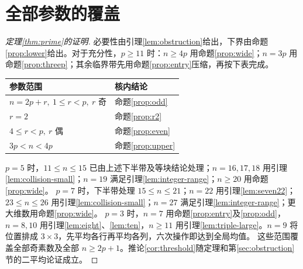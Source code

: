 \section{全部参数的覆盖}\label{sec:completion}
\begin{proof}[定理\ref{thm:prime}的证明]
必要性由引理\ref{lem:obstruction}给出，下界由命题\ref{prop:lower}给出。对于充分性，$p\ge11$ 时：$n\ge4p$ 用命题\ref{prop:wide}；$n=3p$ 用命题\ref{prop:threep}；其余临界带先用命题\ref{prop:entry}压缩，再按下表完成。
\begin{center}
\begin{tabular}{ll}
\toprule 参数范围 & 核内结论\\\midrule
$n=2p+r,\ 1\le r<p,\ r$ 奇 & 命题\ref{prop:odd}\\
$r=2$ & 命题\ref{prop:r2}\\
$4\le r<p,\ r$ 偶 & 命题\ref{prop:even}\\
$3p<n<4p$ & 命题\ref{prop:upper}\\\bottomrule
\end{tabular}
\end{center}
$p=5$ 时，$11\le n\le15$ 已由上述下半带及等块结论处理；$n=16,17,18$ 用引理\ref{lem:collision-small}；$n=19$ 满足引理\ref{lem:integer-range}；$n\ge20$ 用命题\ref{prop:wide}。
$p=7$ 时，下半带处理 $15\le n\le21$；$n=22$ 用引理\ref{lem:seven22}；$23\le n\le26$ 用引理\ref{lem:collision-small}；$n=27$ 满足引理\ref{lem:integer-range}；更大维数用命题\ref{prop:wide}。
$p=3$ 时，$n=7$ 用命题\ref{prop:entry}及\ref{prop:odd}，$n=8,10$ 用引理\ref{lem:eight}、\ref{lem:ten}，$n\ge11$ 用引理\ref{lem:triple-large}。$n=9$ 将位置排成 $3\times3$，先平均各行再平均各列，六次操作即达到全局均值。
这些范围覆盖全部奇素数及全部 $n\ge2p+1$。推论\ref{cor:threshold}随定理和第\ref{sec:obstruction}节的二平均论证成立。
\end{proof}

